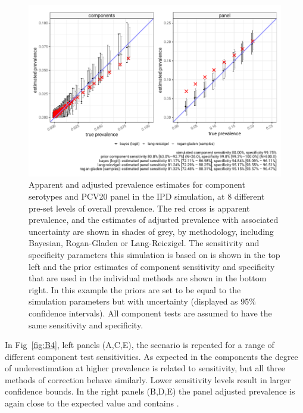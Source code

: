 \documentclass[a4paper, 12pt, twoside]{article}
\begin{document}
\begin{figure}[h!]
\centering
  \includegraphics{fig/simulation_result_sens_80_80_v2}
  \caption{Apparent and adjusted prevalence estimates for component serotypes and PCV20 panel in the IPD simulation, at 8 different pre-set levels of overall prevalence. The red cross is apparent prevalence, and the estimates of adjusted prevalence with associated uncertainty are shown in shades of grey, by methodology, including Bayesian, Rogan-Gladen or Lang-Reiczigel. The sensitivity and specificity parameters this simulation is based on is shown in the top left and the prior estimates of component sensitivity and specificity that are used in the individual methods are shown in the bottom right. In this example the priors are set to be equal to the simulation parameters but with uncertainty (displayed as 95\% confidence intervals). All component tests are assumed to have the same sensitivity and specificity.}
\label{fig:B3}
\end{figure}

In Fig~\ref{fig:B4}, left panels (A,C,E), the scenario is repeated for a range of different component test sensitivities. As expected in the components the degree of underestimation at higher prevalence is related to sensitivity, but all three methods of correction behave similarly. Lower sensitivity levels result in larger confidence bounds. In the right panels (B,D,E) the panel adjusted prevalence is again close to the expected value and contains .
\end{document}
